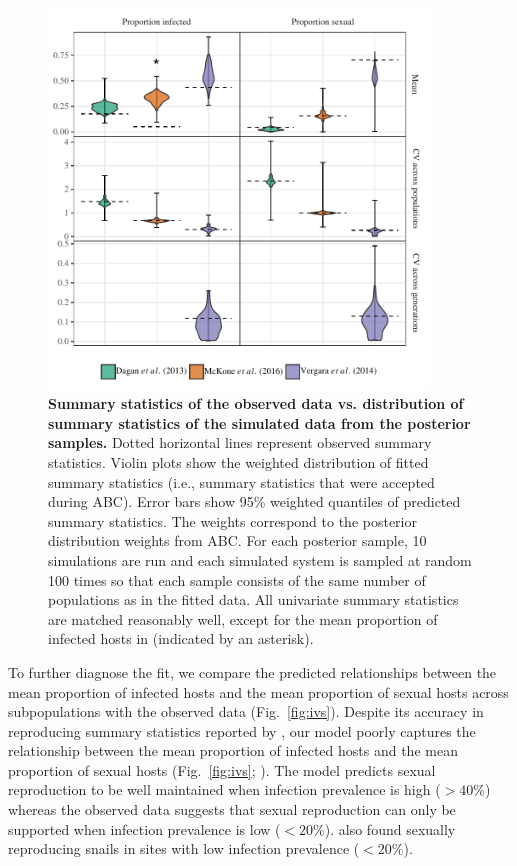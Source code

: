 \documentclass{article}\usepackage[]{graphicx}\usepackage[]{color}
\newcommand{\fref}[1]{Fig.~\ref{fig:#1}}
\begin{document}
\begin{figure}
\begin{center}
\includegraphics[width=0.9\textwidth]{../fig/smc_summary.pdf}
\end{center}
\caption{{\bf Summary statistics of the observed data vs. distribution of summary statistics of the simulated data from the posterior samples.}
Dotted horizontal lines represent observed summary statistics.
Violin plots show the weighted distribution of fitted summary statistics (i.e., summary statistics that were accepted during ABC). 
Error bars show 95\% weighted quantiles of predicted summary statistics.
The weights correspond to the posterior distribution weights from ABC.
For each posterior sample, 10 simulations are run and each simulated system is sampled at random 100 times so that each sample consists of the same number of populations as in the fitted data.
All univariate summary statistics are matched reasonably well, except for the mean proportion of infected hosts in \cite{mckone2016fine} (indicated by an asterisk). 
}
\label{fig:smcsumm}
\end{figure}

To further diagnose the fit, we compare the predicted relationships between the mean proportion of infected hosts and the mean proportion of sexual hosts across subpopulations with the observed data (\fref{ivs}).
Despite its accuracy in reproducing summary statistics reported by \cite{dagan2013clonal}, 
our model poorly captures the relationship between the mean proportion of infected hosts and the mean proportion of sexual hosts (\fref{ivs}; \cite{dagan2013clonal}).
The model predicts sexual reproduction to be well maintained when infection prevalence is high ($> 40\%$) whereas
the observed data \citep{dagan2013clonal} suggests that sexual reproduction can only be supported when infection prevalence is low ($< 20\%$).
\cite{mckone2016fine} also found sexually reproducing snails in sites with low infection prevalence ($< 20\%$).
\end{document}
